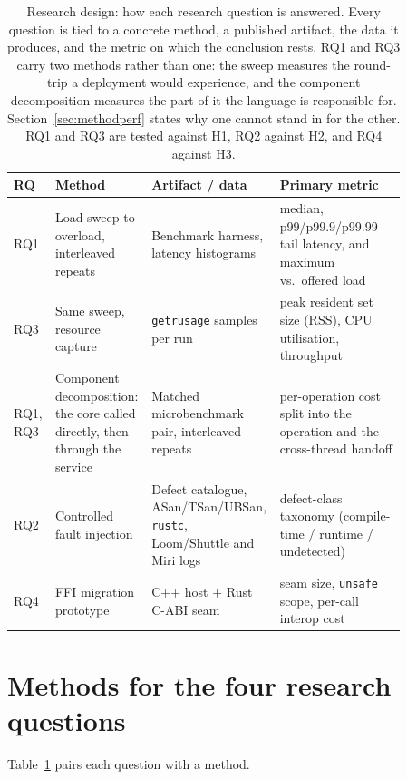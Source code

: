 \documentclass[english,oneside,a4paper,censored,csm,software-track-2020]{HYthesisML}
\renewcommand{\arraystretch}{0.95}
\begin{document}
\begin{table}[H]
\centering
\caption[Research design: how each research question is answered]{Research design: how each research question is answered. Every question is tied to a
concrete method, a published artifact, the data it produces, and the metric on which the
conclusion rests. RQ1 and RQ3 carry two methods rather than one: the sweep measures the
round-trip a deployment would experience, and the component decomposition measures the part of
it the language is responsible for. Section~\ref{sec:methodperf} states why one cannot stand in
for the other. RQ1 and RQ3 are tested against H1, RQ2 against H2, and RQ4 against
H3.\label{tab:design}}
\renewcommand{\arraystretch}{1.25}
\begin{tabular}{@{}p{0.06\linewidth} p{0.24\linewidth} p{0.24\linewidth} p{0.32\linewidth}@{}}
\hline\hline
RQ & Method & Artifact / data & Primary metric \\
\hline
RQ1 & Load sweep to overload, interleaved repeats & Benchmark harness, latency histograms &
median, p99/p99.9/p99.99 tail latency, and maximum vs.\ offered load \\
RQ3 & Same sweep, resource capture & \texttt{getrusage} samples per run &
peak resident set size (RSS), CPU utilisation, throughput \\
RQ1, RQ3 & Component decomposition: the core called directly, then through the service &
Matched microbenchmark pair, interleaved repeats &
per-operation cost split into the operation and the cross-thread handoff \\
RQ2 & Controlled fault injection & Defect catalogue, ASan/TSan/UBSan, \texttt{rustc},
Loom/Shuttle and Miri logs &
defect-class taxonomy (compile-time / runtime / undetected) \\
RQ4 & FFI migration prototype & C++ host $+$ Rust C-ABI seam &
seam size, \texttt{unsafe} scope, per-call interop cost \\
\hline
\end{tabular}
\end{table}

\section{Methods for the four research questions}
Table~\ref{tab:design} pairs each question with a method.
\end{document}
